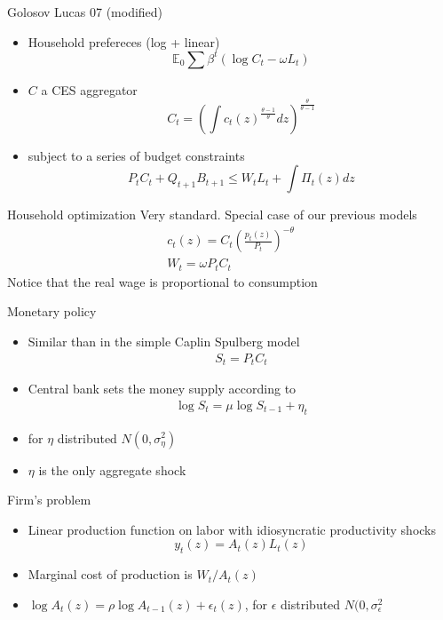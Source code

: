 \documentclass[11pt,aspectratio=169,xcolor={dvipsnames},hyperref={pdftex,pdfpagemode=UseNone,hidelinks,pdfdisplaydoctitle=true},usepdftitle=false]{beamer}
\begin{document}
\begin{frame}{Golosov Lucas 07 (modified)}
\begin{itemize}
\item Household prefereces (log + linear)
$$\mathbb{E}_0 \sum \beta^t \left( \log C_t - \omega L_t \right)$$
\item $C$ a CES aggregator
$$C_t = \left(\int c_t(z)^{\frac{\theta-1}{\theta}} dz \right)^{\frac{\theta}{\theta-1}}$$
\item subject to a series of budget constraints
$$P_t C_t + Q_{t+1} B_{t+1} \leq W_t L_t + \int \Pi_t(z) dz$$
\end{itemize}
\end{frame}

\begin{frame}{Household optimization}
Very standard. Special case of our previous models
\begin{align}
c_t(z) = C_t \left(\frac{p_t(z)}{P_t}\right)^{-\theta}\\
W_t = \omega P_t C_t
\end{align}
Notice that the real wage is proportional to consumption
\end{frame}


\begin{frame}{Monetary policy}
\begin{itemize}
\item Similar than in the simple Caplin Spulberg model
\begin{align}
S_t = P_t C_t
\end{align}
\item Central bank sets the money supply according to
\begin{align}
\log S_t = \mu \log S_{t-1} + \eta_t
\end{align}
\item for $\eta$ distributed $N(0,\sigma^2_\eta)$
\item $\eta$ is the only aggregate shock
\end{itemize}
\end{frame}


\begin{frame}{Firm's problem}
\begin{itemize}
\item Linear production function on labor with idiosyncratic productivity shocks
$$y_t(z) = A_t(z) L_t(z)$$
\item Marginal cost of production is $W_t/A_t(z)$
\item $\log A_t(z)  = \rho \log A_{t-1}(z) + \epsilon_t(z)$, for $\epsilon$ distributed $N(0,\sigma^2_{\epsilon}$ 
\end{itemize}
\end{frame}
\end{document}
